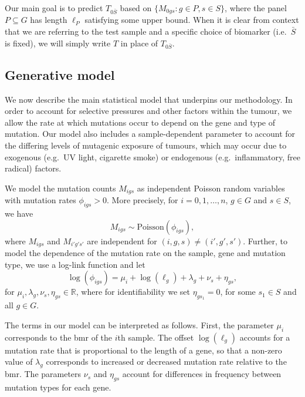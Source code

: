 \documentclass[12pt]{article}
\begin{document}
Our main goal is to predict $T_{0\bar{S}}$ based on $\{M_{0gs}: g \in P, s \in S\}$, where the panel $P \subseteq G$ has length $\ell_P$ satisfying some upper bound. When it is clear from context that we are referring to the test sample and a specific choice of biomarker (i.e.~$\bar{S}$ is fixed), we will simply write $T$ in place of $T_{0\bar{S}}$. 

\subsection{Generative model \label{sec:genmodel}}
We now describe the main statistical model that underpins our methodology. In order to account for selective pressures and other factors within the tumour, we allow the rate at which mutations occur to depend on the gene and type of mutation. Our model also includes a sample-dependent parameter to account for the differing levels of mutagenic exposure of tumours, which may occur due to exogenous (e.g.~UV light, cigarette smoke) or endogenous (e.g.~inflammatory, free radical) factors.  

We model the mutation counts $M_{igs}$ as independent Poisson random variables with mutation rates $\phi_{igs} > 0$. More precisely, for $i = 0, 1, \ldots, n$, $g \in G$ and $s \in S$, we have
\begin{equation}
    \label{eq:Poisson}
M_{igs} \sim \mathrm{Poisson}(\phi_{igs}),
\end{equation}
where $M_{igs}$ and $M_{i'g's'}$ are independent for $(i,g,s) \neq (i',g',s')$.  Further, to model the dependence of the mutation rate on the sample, gene and mutation type, we use a log-link function and let 
\begin{equation}
    \label{eq:loglink}
\log(\phi_{igs}) =  \mu_i + \log(\ell_g) + \lambda_g + \nu_s + \eta_{gs},
\end{equation} 
for $\mu_i, \lambda_{g},\nu_{s},\eta_{gs} \in \mathbb{R}$, where for identifiability we set $\eta_{gs_1} = 0$, for  some $s_1 \in S$ and all $g \in G$. 

The terms in our model can be interpreted as follows. First, the parameter $\mu_i$ corresponds to the \gls{bmr} of the $i$th sample. The offset $\log(\ell_g)$ accounts for a mutation rate that is proportional to the length of a gene, so that a non-zero value of $\lambda_g$ corresponds to increased or decreased mutation rate relative to the \gls{bmr}.  The parameters $\nu_s$ and $\eta_{gs}$ account for differences in frequency between mutation types for each gene. 
\end{document}

